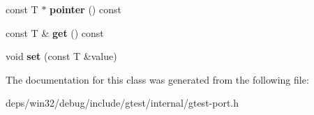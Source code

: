 \begin{DoxyCompactItemize}
\item 
\hypertarget{classtesting_1_1internal_1_1_thread_local_af4b33c12fd2da7d43d8654feccca77f7}{}const T $\ast$ {\bfseries pointer} () const \label{classtesting_1_1internal_1_1_thread_local_af4b33c12fd2da7d43d8654feccca77f7}

\item 
\hypertarget{classtesting_1_1internal_1_1_thread_local_a9cfa47ae6e9e8c19fe8782e2e9c1b13e}{}const T \& {\bfseries get} () const \label{classtesting_1_1internal_1_1_thread_local_a9cfa47ae6e9e8c19fe8782e2e9c1b13e}

\item 
\hypertarget{classtesting_1_1internal_1_1_thread_local_ab5ebc7ba07426cef7167afa2a7707eb4}{}void {\bfseries set} (const T \&value)\label{classtesting_1_1internal_1_1_thread_local_ab5ebc7ba07426cef7167afa2a7707eb4}

\end{DoxyCompactItemize}


The documentation for this class was generated from the following file\+:\begin{DoxyCompactItemize}
\item 
deps/win32/debug/include/gtest/internal/gtest-\/port.\+h\end{DoxyCompactItemize}
